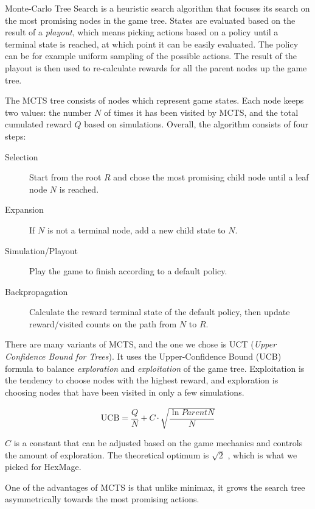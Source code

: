 Monte-Carlo Tree Search \citep{mcts-survey} is a heuristic search algorithm that focuses its search on the most
promising nodes in the game tree. States are evaluated based on the result of a \emph{playout}, which
means picking actions based on a policy until a terminal state is reached, at which point it can be easily
evaluated. The policy can be for example uniform sampling of the possible actions. The result
of the playout is then used to re-calculate rewards for all the parent nodes up the game tree.

The MCTS tree consists of nodes which represent game states. Each node keeps two values: the number $N$ of times
it has been visited by MCTS, and the total cumulated reward $Q$ based on simulations. Overall, the algorithm consists of four steps:

\begin{description}
	\item[Selection] Start from the root $R$ and chose the most promising child node until a leaf node $N$ is reached.
	\item[Expansion] If $N$ is not a terminal node, add a new child state to $N$.
	\item[Simulation/Playout] Play the game to finish according to a default policy.
	\item[Backpropagation] Calculate the reward terminal state of the default policy, then update reward/visited counts on the path from $N$ to $R$.
\end{description}

There are many variants of MCTS, and the one we chose is UCT (\emph{Upper Confidence Bound for Trees}). It uses the Upper-Confidence Bound (UCB) formula to balance \emph{exploration} and \emph{exploitation} of the game tree. Exploitation is the tendency to choose nodes with the highest reward, and exploration is choosing nodes that have been visited in only a few simulations.

\begin{equation}
	\text{UCB} = \frac{Q}{N} + C \cdot \sqrt{\frac{\ln ParentN}{N}}	
\end{equation}

$C$ is a constant that can be adjusted based on the game mechanics and controls the amount of exploration. The theoretical optimum is $\sqrt{2}$ \citep{mcts-survey}, which is what we picked for HexMage.

One of the advantages of MCTS is that unlike minimax, it grows the search tree asymmetrically towards
the most promising actions.

